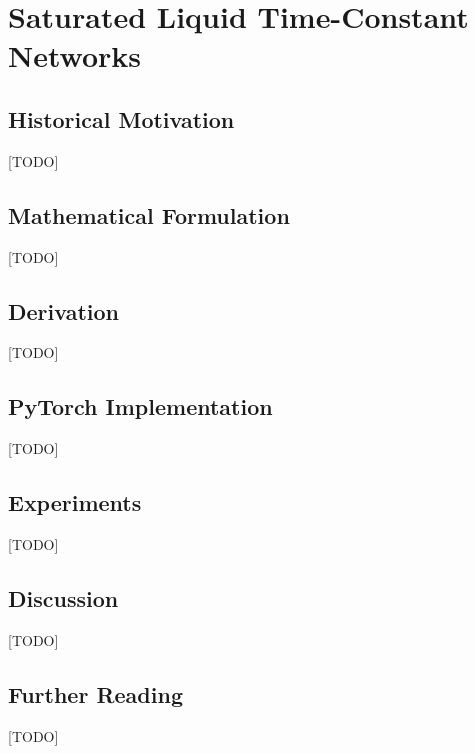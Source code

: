 
\chapter{Saturated Liquid Time-Constant Networks}
\label{ch:15_stc}


\section{Historical Motivation}
[TODO]

\section{Mathematical Formulation}
[TODO]

\section{Derivation}
[TODO]

\section{PyTorch Implementation}
[TODO]

\section{Experiments}
[TODO]

\section{Discussion}
[TODO]

\section{Further Reading}
[TODO]
